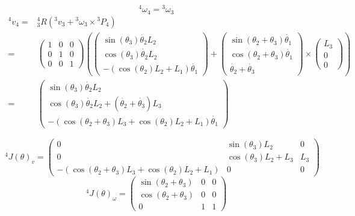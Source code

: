 \documentclass[10pt,a4paper]{article}
\begin{document}
\begin{equation*}
  {}^{4}\omega_{4} = {}^{3}\omega_{3}
\end{equation*}
\begin{align*}
  {}^{4}v_{4} = & {}_{3}^{4}R \left( {}^{3}v_{3} + {}^{3}\omega_{3} \times {}^{3}P_{4} \right)\\
  = & \begin{pmatrix}
    1 & 0 & 0\\
    0 & 1 & 0\\
    0 & 0 & 1
  \end{pmatrix} \left(
            \begin{pmatrix}
              \sin(\theta_{3}) \dot{\theta_{2}} L_{2}\\
              \cos(\theta_{3}) \dot{\theta_{2}} L_{2}\\
              -\left( \cos(\theta_{2})L_{2} + L_{1} \right) \dot{\theta_{1}}
            \end{pmatrix}
  +
  \begin{pmatrix}
    \sin(\theta_{2} + \theta_{3}) \dot{\theta_{1}}\\
    \cos(\theta_{2} + \theta_{3}) \dot{\theta_{1}}\\
    \dot{\theta_{2}} + \dot{\theta_{3}}
  \end{pmatrix}
  \times
  \begin{pmatrix}
    L_{3}\\0\\0
  \end{pmatrix}
  \right)\\
  = & \begin{pmatrix}
    \sin(\theta_{3}) \dot{\theta_{2}} L_{2}\\
    \cos(\theta_{3}) \dot{\theta_{2}} L_{2} + \left( \dot{\theta_{2}} + \dot{\theta_{3}} \right)L_{3}\\
    -\left( \cos(\theta_{2} + \theta_{3}) L_{3} + \cos(\theta_{2})L_{2} + L_{1} \right) \dot{\theta_{1}}
  \end{pmatrix}
\end{align*}

\begin{equation*}
  {}^{4}J(\theta)_{v} = \begin{pmatrix}
    0 & \sin(\theta_{3})L_{2} & 0\\
    0 & \cos(\theta_{3})L_{2} + L_{3} & L_{3}\\
    -\left( \cos(\theta_{2} + \theta_{3}) L_{3} + \cos(\theta_{2})L_{2} + L_{1} \right) & 0 & 0
  \end{pmatrix}
\end{equation*}
\begin{equation*}
  {}^{4}J(\theta)_{\omega} = \begin{pmatrix}
    \sin(\theta_{2} + \theta_{3}) & 0 & 0\\
    \cos(\theta_{2} + \theta_{3}) & 0 & 0\\
    0 & 1 & 1
  \end{pmatrix}
\end{equation*}
\end{document}
